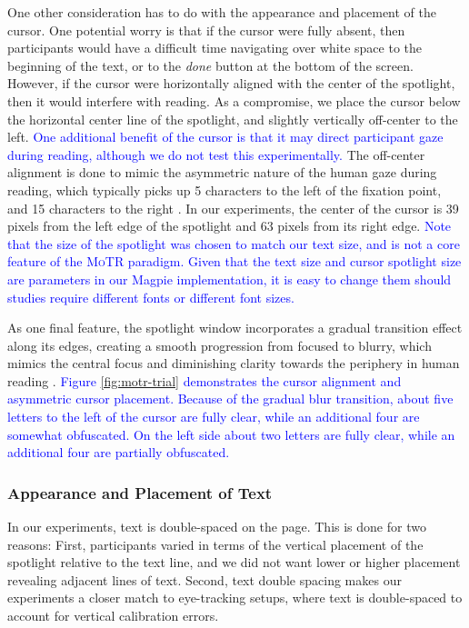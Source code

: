 \documentclass[12pt]{article}
\newcommand{\motr}{\textsc{MoTR}\xspace}
\newcommand{\word}[1]{\textit{#1}}
\newcommand{\change}[1]{\textcolor{blue}{#1}}
\begin{document}
One other consideration has to do with the appearance and placement of the cursor. One potential worry is that if the cursor were fully absent, then participants would have a difficult time navigating over white space to the beginning of the text, or to the \word{done} button at the bottom of the screen. However, if the cursor were horizontally aligned with the center of the spotlight, then it would interfere with reading. As a compromise, we place the cursor below the horizontal center line of the spotlight, and slightly vertically off-center to the left. \change{One additional benefit of the cursor is that it may direct participant gaze during reading, although we do not test this experimentally.} The off-center alignment is done to mimic the asymmetric nature of the human gaze during reading, which typically picks up 5 characters to the left of the fixation point, and 15 characters to the right \citep{mcconkie1976asymmetry, rayner1980asymmetry}. In our experiments, the center of the cursor is 39 pixels from the left edge of the spotlight and 63 pixels from its right edge. \change{Note that the size of the spotlight was chosen to match our text size, and is not a core feature of the \motr paradigm. Given that the text size and cursor spotlight size are parameters in our Magpie implementation, it is easy to change them should studies require different fonts or different font sizes.} 

As one final feature, the spotlight window incorporates a gradual transition effect along its edges, creating a smooth progression from focused to blurry, which mimics the central focus and diminishing clarity towards the periphery in human reading \citep{rayner1998eye}. \change{Figure \ref{fig:motr-trial} demonstrates the cursor alignment and asymmetric cursor placement. Because of the gradual blur transition, about five letters to the left of the cursor are fully clear, while an additional four are somewhat obfuscated. On the left side about two letters are fully clear, while an additional four are partially obfuscated.}

\subsubsection{Appearance and Placement of Text}

In our experiments, text is double-spaced on the page. This is done for two reasons: First, participants varied in terms of the vertical placement of the spotlight relative to the text line, and we did not want lower or higher placement revealing adjacent lines of text. Second, text double spacing makes our experiments a closer match to eye-tracking setups, where text is double-spaced to account for vertical calibration errors.
\end{document}
